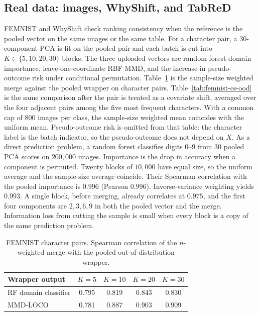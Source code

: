 \subsection{Real data: images, WhyShift, and TabReD}
\label{sec:real-fed}

FEMNIST \cite{leaf_federated_dataset} and WhyShift
\cite{WhyShift_Attribution} check ranking consistency when the reference
is the pooled vector on the same images or the same table.
For a character pair, a \(30\)-component PCA is fit on the pooled pair and
each batch is cut into \(K\in\{5,10,20,30\}\) blocks.
The three uploaded vectors are random-forest domain importance,
leave-one-coordinate RBF MMD, and the increase in pseudo-outcome risk
under conditional permutation.
Table~\ref{tab:femnist-ood} is the sample-size weighted merge against the
pooled wrapper on character pairs.
Table~\ref{tab:femnist-cs-ood} is the same comparison after the pair is
treated as a covariate shift, averaged over the four adjacent pairs among
the five most frequent characters.
With a common cap of \(800\) images per class, the sample-size weighted
mean coincides with the uniform mean.
Pseudo-outcome risk is omitted from that table: the character label is the
batch indicator, so the pseudo-outcome does not depend on \(X\).
As a direct prediction problem, a random forest classifies digits \(0\)--\(9\)
from \(30\) pooled PCA scores on \(200{,}000\) images.
Importance is the drop in accuracy when a component is permuted.
Twenty blocks of \(10{,}000\) have equal size, so the uniform average and
the sample-size average coincide.
Their Spearman correlation with the pooled importance is \(0.996\)
(Pearson \(0.996\)).
Inverse-variance weighting yields \(0.993\).
A single block, before merging, already correlates at \(0.975\), and the
first four components are \(2,3,6,9\) in both the pooled vector and the
merge.
Information loss from cutting the sample is small when every block is a
copy of the same prediction problem.

\begin{table}[t]
\centering
\caption{FEMNIST character pairs.
Spearman correlation of the \(n\)-weighted merge with the pooled
out-of-distribution wrapper.}
\label{tab:femnist-ood}
\small
\begin{tabular}{lcccc}
\toprule
Wrapper output & \(K=5\) & \(K=10\) & \(K=20\) & \(K=30\) \\
\midrule
RF domain classifier & 0.795 & 0.819 & 0.843 & 0.830 \\
MMD-LOCO & 0.781 & 0.887 & 0.903 & 0.909 \\
\bottomrule
\end{tabular}
\end{table}

